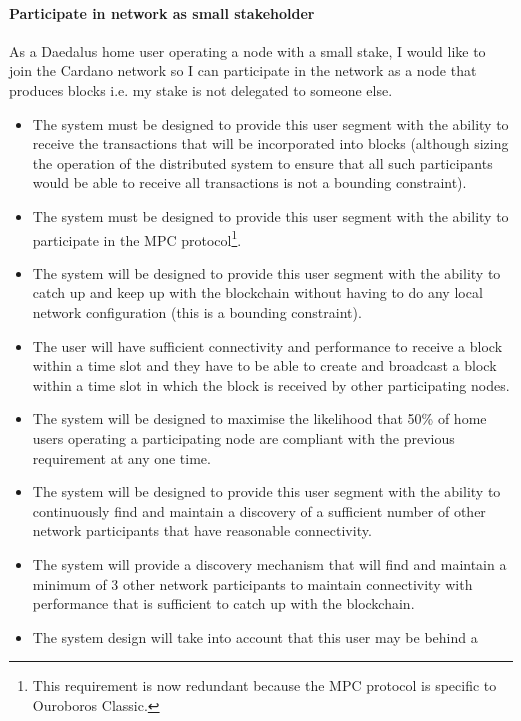 \documentclass{report}
\theoremstyle{definition}{
  \newtheorem{lemma}{Lemma}[section] %
  \newtheorem{definition}[lemma]{Definition}
}
\theoremstyle{theorem}{
  \newtheorem{invariant}[lemma]{Invariant}
  \newtheorem{proofobligation}[lemma]{Proof Obligation}
}
\numberwithin{equation}{lemma}
\begin{document}
\paragraph{Participate in network as small stakeholder}

As a Daedalus home user operating a node with a small stake,
I would like to join the Cardano network so I can participate in the network as a
node that produces blocks i.e. my stake is not delegated to someone else.

\begin{itemize}
\item The system must be designed to provide this user segment with the ability to
      receive the transactions that will be incorporated into blocks (although
      sizing the operation of the distributed system to ensure that all such
      participants would be able to receive all transactions is not a bounding
      constraint).
\item The system must be designed to provide this user segment with the ability to
      participate in the MPC protocol\footnote{This requirement is now
      redundant because the MPC protocol is specific to Ouroboros Classic.}.
\item The system will be designed to provide this user segment with the ability
      to catch up and keep up with the blockchain without having to do any local
      network configuration (this is a bounding constraint).
\item The user will have sufficient connectivity and performance to receive a
      block within a time slot {\sc and} they have to be able to create and
      broadcast a block within a time slot in which the block is received by
      other participating nodes.
\item The system will be designed to maximise the likelihood that 50\% of home
      users operating a participating node are compliant with the previous requirement
      at any one time.
\item The system will be designed to provide this user segment with the ability
      to continuously find and maintain a discovery of a sufficient number of
      other network participants that have reasonable connectivity.
\item The system will provide a discovery mechanism that will find and maintain
      a minimum of 3 other network participants to maintain connectivity with
      performance that is sufficient to catch up with the blockchain.
\item The system design will take into account that this user may be behind a

\end{itemize}
\end{document}
